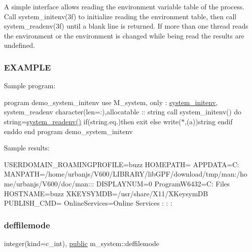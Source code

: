 A simple interface allows reading the environment variable table of the process. Call system\+\_\+initenv(3f) to initialize reading the environment table, then call system\+\_\+readenv(3f) until a blank line is returned. If more than one thread reads the environment or the environment is changed while being read the results are undefined.

\subsubsection*{E\+X\+A\+M\+P\+LE}

Sample program\+:

program demo\+\_\+system\+\_\+initenv use M\+\_\+system, only \+: \hyperlink{interfacem__system_1_1system__initenv}{system\+\_\+initenv}, system\+\_\+readenv character(len=\+:),allocatable \+:\+: string call system\+\_\+initenv() do string=\hyperlink{namespacem__system_ae0e43010a82a6a25402568ccb326322d}{system\+\_\+readenv()} if(string.\+eq.\textquotesingle{}\textquotesingle{})then exit else write($\ast$,\textquotesingle{}(a)\textquotesingle{})string endif enddo end program demo\+\_\+system\+\_\+initenv

Sample results\+:

U\+S\+E\+R\+D\+O\+M\+A\+I\+N\+\_\+\+R\+O\+A\+M\+I\+N\+G\+P\+R\+O\+F\+I\+LE=buzz H\+O\+M\+E\+P\+A\+TH= A\+P\+P\+D\+A\+TA=C\+: M\+A\+N\+P\+A\+TH=/home/urbanjs/\+V600/\+L\+I\+B\+R\+A\+R\+Y/lib\+G\+P\+F/download/tmp/man\+:/home/urbanjs/\+V600/doc/man\+:\+:\+: D\+I\+S\+P\+L\+A\+Y\+N\+UM=0 Program\+W6432=C\+: Files H\+O\+S\+T\+N\+A\+ME=buzz X\+K\+E\+Y\+S\+Y\+M\+DB=/usr/share/\+X11/\+X\+Keysym\+DB P\+U\+B\+L\+I\+S\+H\+\_\+\+C\+MD= Online\+Services=Online Services \+: \+: \+: \mbox{\label{namespacem__system_ac5de3a592742c0daa16a4f367ea41c74}} 
\subsubsection{\texorpdfstring{deffilemode}{deffilemode}}
{\footnotesize\ttfamily integer(kind=c\+\_\+int), \hyperlink{M__stopwatch_83_8txt_a2f74811300c361e53b430611a7d1769f}{public} m\+\_\+system\+::deffilemode}

\mbox{\label{namespacem__system_a88c1027ebd95e4fb92e57c5d764e5689}} 
